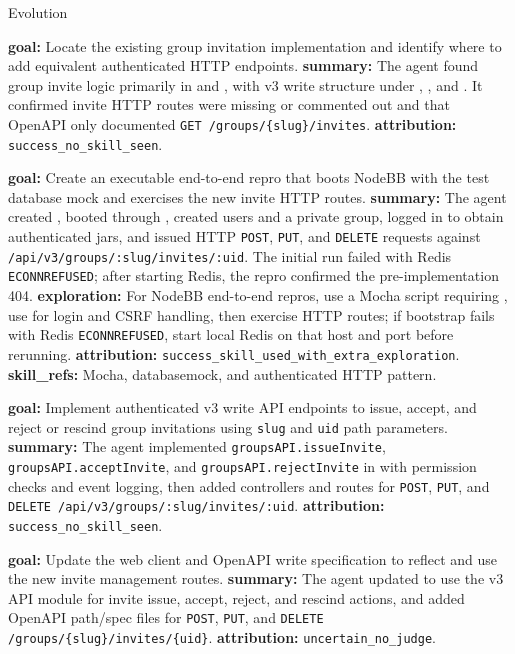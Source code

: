 \begin{svpromptbox}{Evolution}
\svpartsep
{}
\begin{enumerate}[label=\textnormal{[\arabic*]}, leftmargin=*]
    \item \textbf{goal:} Locate the existing group invitation implementation and identify where to add equivalent authenticated HTTP endpoints. \textbf{summary:} The agent found group invite logic primarily in  and , with v3 write structure under , , and . It confirmed invite HTTP routes were missing or commented out and that OpenAPI only documented \texttt{GET /groups/\{slug\}/invites}. \textbf{attribution:} \texttt{success\_no\_skill\_seen}.
    \item \textbf{goal:} Create an executable end-to-end repro that boots NodeBB with the test database mock and exercises the new invite HTTP routes. \textbf{summary:} The agent created , booted through , created users and a private group, logged in to obtain authenticated jars, and issued HTTP \texttt{POST}, \texttt{PUT}, and \texttt{DELETE} requests against \texttt{/api/v3/groups/:slug/invites/:uid}. The initial run failed with Redis \texttt{ECONNREFUSED}; after starting Redis, the repro confirmed the pre-implementation 404. \textbf{exploration:} For NodeBB end-to-end repros, use a Mocha script requiring , use  for login and CSRF handling, then exercise HTTP routes; if bootstrap fails with Redis \texttt{ECONNREFUSED}, start local Redis on that host and port before rerunning. \textbf{attribution:} \texttt{success\_skill\_used\_with\_extra\_exploration}. \textbf{skill\_refs:}  Mocha, databasemock, and authenticated HTTP pattern.
    \item \textbf{goal:} Implement authenticated v3 write API endpoints to issue, accept, and reject or rescind group invitations using \texttt{slug} and \texttt{uid} path parameters. \textbf{summary:} The agent implemented \texttt{groupsAPI.issueInvite}, \texttt{groupsAPI.acceptInvite}, and \texttt{groupsAPI.rejectInvite} in  with permission checks and event logging, then added controllers and routes for \texttt{POST}, \texttt{PUT}, and \texttt{DELETE /api/v3/groups/:slug/invites/:uid}. \textbf{attribution:} \texttt{success\_no\_skill\_seen}.
    \item \textbf{goal:} Update the web client and OpenAPI write specification to reflect and use the new invite management routes. \textbf{summary:} The agent updated  to use the v3 API module for invite issue, accept, reject, and rescind actions, and added OpenAPI path/spec files for \texttt{POST}, \texttt{PUT}, and \texttt{DELETE /groups/\{slug\}/invites/\{uid\}}. \textbf{attribution:} \texttt{uncertain\_no\_judge}.

\end{enumerate}
\end{svpromptbox}
